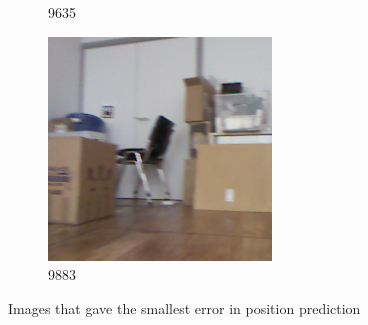 \documentclass{article}
\begin{document}
\begin{figure}[H]
\begin{subfigure}[b]{0.3\textwidth}
    \caption{9635}
  \end{subfigure}
  \begin{subfigure}[b]{0.3\textwidth}
    \includegraphics[width=\textwidth]{../bestimages/2019-01-31-14-43-59-991355.png}
    \caption{9883}
  \end{subfigure}
  \caption{Images that gave the smallest error in position prediction}
\end{figure}
\end{document}
